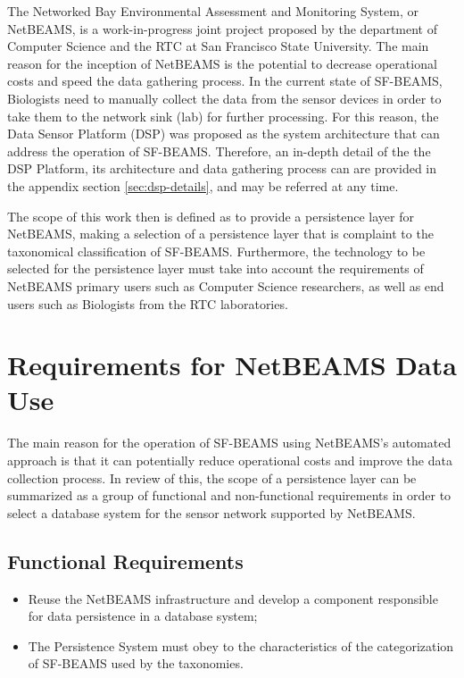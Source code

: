 The Networked Bay Environmental Assessment and Monitoring System, or NetBEAMS, 
is a work-in-progress joint project proposed by the department of Computer
Science and the RTC at San Francisco State University. The main reason for the
inception of NetBEAMS is the potential to decrease operational costs and speed
the data gathering process. In the current state of SF-BEAMS, Biologists need
to manually collect the data from the sensor devices in order to take them to
the network sink (lab) for further processing. For this reason, the Data
Sensor Platform (DSP) \cite{netbeams2009} was proposed as the system
architecture that can address the operation of SF-BEAMS. Therefore, an in-depth
detail of the the DSP Platform, its architecture and data gathering process
can are provided in the appendix section \ref{sec:dsp-details}, and may be
referred at any time.

The scope of this work then is defined as to provide a persistence layer for
NetBEAMS, making a selection of a persistence layer that is complaint to the
taxonomical classification of SF-BEAMS. Furthermore, the technology to be
selected for the persistence layer must take into account the requirements of
NetBEAMS primary users such as Computer Science researchers, as well as end
users such as Biologists from the RTC laboratories.

\section{Requirements for NetBEAMS Data Use}

The main reason for the operation of SF-BEAMS using NetBEAMS's automated
approach is that it can potentially reduce operational costs and improve the
data collection process. In review of this, the scope of a persistence layer
can be summarized as a group of functional and non-functional requirements in
order to select a database system for the sensor network supported by NetBEAMS.

\subsection{Functional Requirements}

\begin{itemize}
  \item Reuse the NetBEAMS infrastructure and develop a component responsible
  for data persistence in a database system;
  \item The Persistence System must obey to the characteristics of the
  categorization of SF-BEAMS used by the taxonomies. 
\end{itemize}

